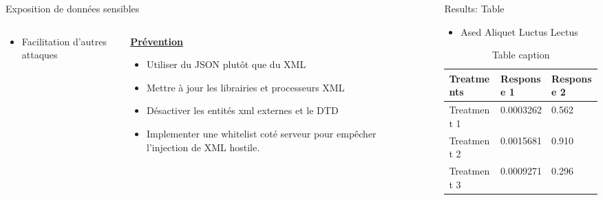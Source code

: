 \documentclass[final,hyperref={pdfpagelabels=false}]{beamer}
\begin{document}
\begin{frame}[t]
\begin{columns}[t]
\begin{column}{.465\textwidth}
\begin{block}{Exposition de données sensibles}
\begin{columns}[T]
\begin{column}{0.495\textwidth}
\begin{itemize}
                \item Facilitation d'autres attaques
			\end{itemize}
			\vfill
		\end{column}
		\begin{column}{0.495\textwidth}
			\vfill
			\uline{\textbf{Prévention}}
			\begin{itemize}
				\item Utiliser du JSON plutôt que du XML
                \item Mettre à jour les librairies et processeurs XML
                \item Désactiver les entités xml externes et le DTD
                \item Implementer une whitelist coté serveur pour empêcher
                    l'injection de XML hostile.
			\end{itemize}
		\end{column}
	\end{columns}
\end{block}

\end{column} %

\begin{column}{.03\textwidth}\end{column} %
 
\begin{column}{.465\textwidth} %


\begin{block}{Results: Table}

\begin{itemize}
\item Ased Aliquet Luctus Lectus
\end{itemize}

\begin{table}
\begin{tabular}{l l l}
\toprule
\textbf{Treatments} & \textbf{Response 1} & \textbf{Response 2}\\
\midrule
Treatment 1 & 0.0003262 & 0.562 \\
Treatment 2 & 0.0015681 & 0.910 \\
Treatment 3 & 0.0009271 & 0.296 \\
\bottomrule
\end{tabular}
\caption{Table caption}
\end{table}


\end{block}
\end{column}
\end{columns}
\end{frame}
\end{document}
